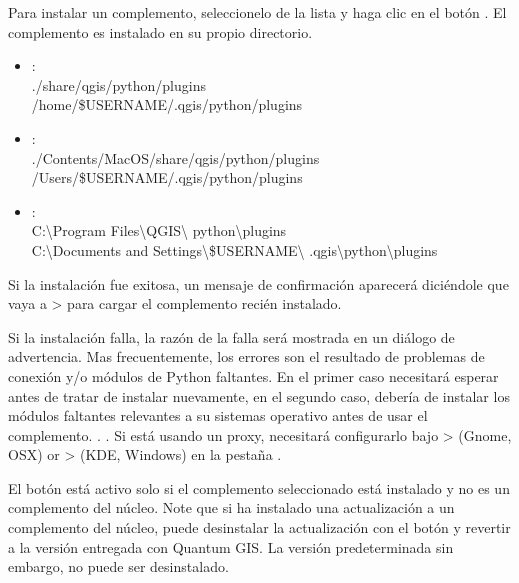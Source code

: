 
Para instalar un complemento, seleccionelo de la lista y haga clic en el botón . El complemento es instalado en su propio directorio. 

\begin{itemize}
\item {}:\\
./share/qgis/python/plugins \\
/home/\$USERNAME/.qgis/python/plugins
\item {}:\\
./Contents/MacOS/share/qgis/python/plugins \\
/Users/\$USERNAME/.qgis/python/plugins
\item {}:\\
C:\textbackslash Program Files\textbackslash QGIS\textbackslash
python\textbackslash plugins \\
C:\textbackslash Documents and Settings\textbackslash\$USERNAME\textbackslash
.qgis\textbackslash python\textbackslash plugins
\end{itemize}

Si la instalación fue exitosa, un mensaje de confirmación aparecerá diciéndole  que vaya a   >  para cargar el complemento recién instalado.

Si la instalación falla, la razón de la falla será mostrada en un diálogo de advertencia. Mas frecuentemente, los errores son el resultado de problemas de conexión y/o módulos de Python faltantes. En el primer caso necesitará esperar antes de tratar de instalar nuevamente, en el  segundo caso, debería de instalar los módulos faltantes relevantes a su sistemas operativo antes de usar el complemento. . . Si está usando un proxy, necesitará configurarlo bajo  >  (Gnome, OSX) 
or  >  (KDE, Windows) en la pestaña .

El botón  está activo solo si el complemento seleccionado está instalado y no es un complemento del núcleo. Note que si ha instalado una actualización a un complemento del núcleo, puede desinstalar la actualización con el botón  y revertir a la versión entregada con Quantum GIS. La versión predeterminada sin embargo, no puede ser desinstalado.

